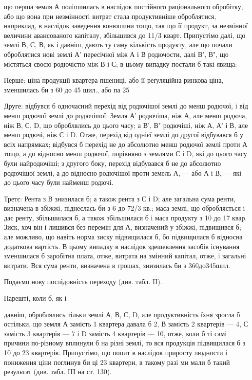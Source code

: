 що перша земля А поліпшилась в наслідок постійного раціонального обробітку,
або що вона при незмінності витрат стала продуктивніше оброблятися,
наприклад, в наслідок заведення конюшини тощо, так що її продукт, за незмінної
величини авансованого капіталу, збільшився до 11/3 кварт. Припустімо
далі, що землі В, С, В, як і давніш, дають ту саму кількість продукту, але що
почали оброблятися нові землі А' пересічної між А і В родючости, далі В', В", що
містяться своєю родючістю між В і С; в цьому випадку постали б такі явища:

Перше: ціна продукції квартера пшениці, або її реґуляційна ринкова
ціна, зменшилась би з 60 до 45 шил., або па 25%

Друге: відбувся б одночасний перехід від родючішої землі до менш
родючої, і від менш родючої землі до родючішої. Земля А' родючіша, ніж А, але
менш родюча, ніж В, С, D, що оброблялись до цього часу; а В', В" родючіші, ніж
А, А' і В, але менш родючі, ніж С і D. Отже, перехід від однієї землі до другої
відбувався б у всіх напрямках; відбувся б перехід не до абсолютно
менш родючої землі проти А тощо, а до відносно менш родючої, порівняно
з землями С і D, які до цього часу були найродючіші; з другого боку, перехід
відбувався б не до абсолютно родючішої землі, а до відносно родючішої проти
земель А, — або А і В, — які до цього часу були найменш родючі.

Третє: Рента з В знизилася б; а також рента з С і D; але загальна
сума ренти, визначена в збіжжі, піднеслась би з 6 до 72/3 кв.; маса землі, що
обробляється і дає ренту, збільшилася б, а також збільшилася б і маса продукту
з 10 до 17 квар. Зиск, хоч він і лишився без перемін для А, визначений у
збіжжі, підвищився б; але можливо, що навіть норма зиску підвищилася б, бо
підвищилася б відносна додаткова вартість. В цьому випадку в наслідок здешевлення
засобів
існування
зменшилася б
заробітна плата,
отже, витрата
на змінний
капітал,
отже, і загальні
витрати. Вся
сума ренти,
визначена в
грошах, знизилась
би з
360до345шил.

Подаємо
нову послідовність
переходу
(див. табл. II).

Нарешті,
коли б, як і

давніш, оброблялись тільки землі А, В, С, D, але продуктивність їхня зросла б
остільки, що земля А замість 1 квартера давала б 2, В замість 2 квартерів — 4,
С замість 3 квартерів — 7 і D замість 4 квартерів — 10, отже, коли б ті самі
причини по-різному вплинули б на різні землі, то вся продукція підвищилася
б з 10 до 23 квартерів. Припустімо, що попит в наслідок приросту
людности і пониження ціни поглинув би ці 23 квартери, в такому разі ми
мали б такий результат (див. табл. III на ст. 130).

